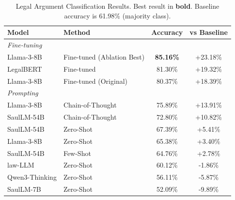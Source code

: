 \begin{table}[t]
\centering
\caption{Legal Argument Classification Results. Best result in \textbf{bold}. Baseline accuracy is 61.98\% (majority class).}
\label{tab:main_results}
\small
\begin{tabular}{llcc}
\toprule
\textbf{Model} & \textbf{Method} & \textbf{Accuracy} & \textbf{vs Baseline} \\
\midrule
\multicolumn{4}{l}{\textit{Fine-tuning}} \\
Llama-3-8B & Fine-tuned (Ablation Best) & \textbf{85.16\%} & +23.18\% \\
LegalBERT & Fine-tuned & 81.30\% & +19.32\% \\
Llama-3-8B & Fine-tuned (Original) & 80.37\% & +18.39\% \\
\midrule
\multicolumn{4}{l}{\textit{Prompting}} \\
Llama-3-8B & Chain-of-Thought & 75.89\% & +13.91\% \\
SaulLM-54B & Chain-of-Thought & 72.80\% & +10.82\% \\
SaulLM-54B & Zero-Shot & 67.39\% & +5.41\% \\
Llama-3-8B & Zero-Shot & 65.38\% & +3.40\% \\
SaulLM-54B & Few-Shot & 64.76\% & +2.78\% \\
law-LLM & Zero-Shot & 60.12\% & -1.86\% \\
Qwen3-Thinking & Zero-Shot & 56.11\% & -5.87\% \\
SaulLM-7B & Zero-Shot & 52.09\% & -9.89\% \\
\bottomrule
\end{tabular}
\end{table}
